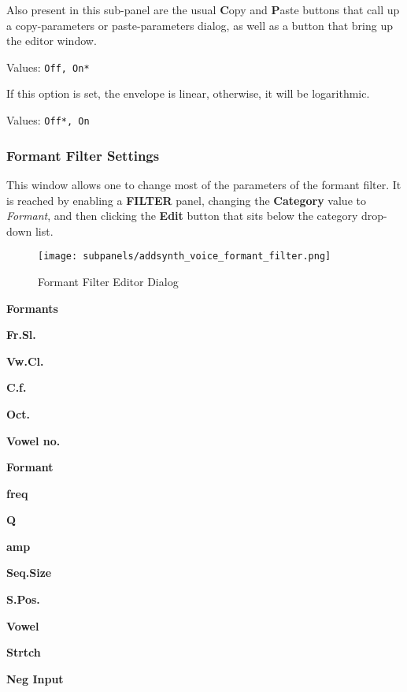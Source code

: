    Also present in this sub-panel are the usual \textbf{C}opy
   and \textbf{P}aste buttons that call up a copy-parameters or
   paste-parameters dialog, as well as a button that bring up the editor
   window.


   Values: \texttt{Off, On*}

   If this option is set, the envelope is linear, otherwise, it will be
   logarithmic.

   Values: \texttt{Off*, On}

\subsubsection{Formant Filter Settings}
\label{subsubsec:formant_filter_settings}

   This window allows one to change most of the parameters of the formant
   filter.   It is reached by enabling a \textbf{FILTER} panel,
   changing the \textbf{Category} value to \textsl{Formant}, and then clicking
   the \textbf{Edit} button that sits below the category drop-down list.

\begin{figure}[H]
   \centering 
   \texttt{[image: subpanels/addsynth\_voice\_formant\_filter.png]}
   \caption[Formant Filter Editor]{Formant Filter Editor Dialog}
   \label{fig:formant_filter_editor}
\end{figure}

   \begin{enumber}
      \item \textbf{Formants}
      \item \textbf{Fr.Sl.}
      \item \textbf{Vw.Cl.}
      \item \textbf{C.f.}
      \item \textbf{Oct.}
      \item \textbf{Vowel no.}
      \item \textbf{Formant}
      \item \textbf{freq}
      \item \textbf{Q}
      \item \textbf{amp}
      \item \textbf{Seq.Size}
      \item \textbf{S.Pos.}
      \item \textbf{Vowel}
      \item \textbf{Strtch}
      \item \textbf{Neg Input}
   \end{enumber}

